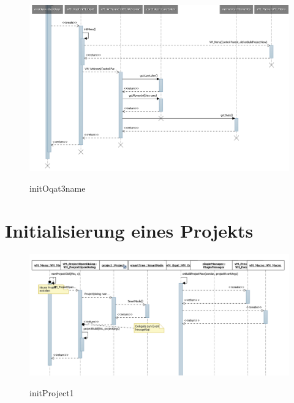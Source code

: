 \begin{figure}[h]
\includegraphics[width=\linewidth]{bilder/Sequenzdiagramm/initOqat3.png}
\label{}
\caption{initOqat3name}
\end{figure}

\section{Initialisierung eines Projekts}
\begin{figure}[h]
\includegraphics[width=\linewidth]{bilder/Sequenzdiagramm/initProject1.png}
\label{}
\caption{initProject1}
\end{figure}

